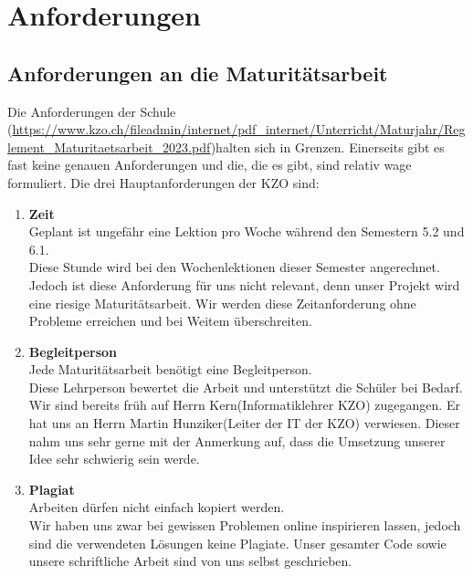 \chapter{Anforderungen}

\section{Anforderungen an die Maturitätsarbeit}
Die Anforderungen der Schule (\url{https://www.kzo.ch/fileadmin/internet/pdf_internet/Unterricht/Maturjahr/Reglement_Maturitaetsarbeit_2023.pdf})halten sich in Grenzen. Einerseits gibt es fast keine
genauen Anforderungen und die, die es gibt, sind relativ wage formuliert. Die drei Hauptanforderungen der KZO sind:
\begin{enumerate}
    \item \textbf{Zeit} \\
        Geplant ist ungefähr eine Lektion pro Woche während den Semestern 5.2 und 6.1. \\Diese Stunde wird bei den Wochenlektionen dieser Semester angerechnet.
        Jedoch ist diese Anforderung für uns nicht relevant, denn unser Projekt wird eine riesige Maturitätsarbeit.
        Wir werden diese Zeitanforderung ohne Probleme erreichen und bei Weitem überschreiten.
    \item \textbf{Begleitperson} \\
        Jede Maturitätsarbeit benötigt eine Begleitperson. \\Diese Lehrperson bewertet die Arbeit und unterstützt die Schüler bei Bedarf.
        Wir sind bereits früh auf Herrn Kern(Informatiklehrer KZO) zugegangen.
        Er hat uns an Herrn Martin Hunziker(Leiter der IT der KZO) verwiesen. Dieser nahm uns sehr gerne mit der Anmerkung auf, dass die Umsetzung unserer Idee sehr schwierig sein werde.
        
    \item \textbf{Plagiat} \\
        Arbeiten dürfen nicht einfach kopiert werden. \\Wir haben uns zwar bei gewissen Problemen online inspirieren lassen, jedoch sind die verwendeten Lösungen keine Plagiate.
        Unser gesamter Code sowie unsere schriftliche Arbeit sind von uns selbst geschrieben.
\end{enumerate}

